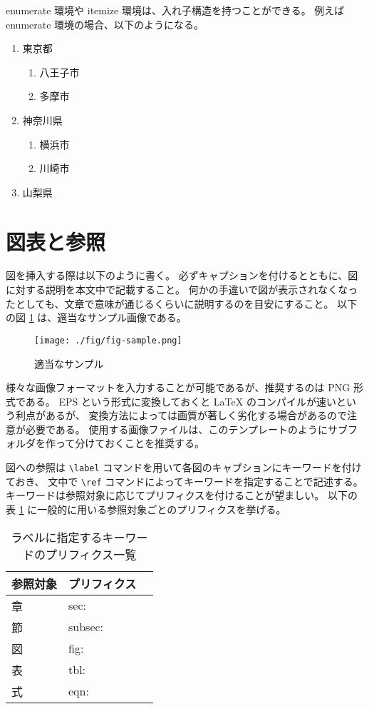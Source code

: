 \documentclass[12pt,a4paper,uplatex,dvipdfmx]{jsarticle}
\begin{document}
enumerate 環境や itemize 環境は、入れ子構造を持つことができる。
例えば enumerate 環境の場合、以下のようになる。
\begin{enumerate}
 \item 東京都
 \begin{enumerate}
  \item 八王子市
  \item 多摩市
 \end{enumerate}
 \item 神奈川県
 \begin{enumerate}
  \item 横浜市
  \item 川崎市
 \end{enumerate}
 \item 山梨県
\end{enumerate}

\section{図表と参照}
\label{sec:fig_tbl}

図を挿入する際は以下のように書く。
必ずキャプションを付けるとともに、図に対する説明を本文中で記載すること。
何かの手違いで図が表示されなくなったとしても、文章で意味が通じるくらいに説明するのを目安にすること。
以下の図 \ref{fig:sample} は、適当なサンプル画像である。

\begin{figure}[H]
  \centering
  \texttt{[image: ./fig/fig-sample.png]}
  \caption{適当なサンプル}
  \label{fig:sample}
\end{figure}

様々な画像フォーマットを入力することが可能であるが、推奨するのは PNG 形式である。
EPS という形式に変換しておくと LaTeX のコンパイルが速いという利点があるが、
変換方法によっては画質が著しく劣化する場合があるので注意が必要である。
使用する画像ファイルは、このテンプレートのようにサブフォルダを作って分けておくことを推奨する。

図への参照は \verb+\label+ コマンドを用いて各図のキャプションにキーワードを付けておき、
文中で \verb+\ref+ コマンドによってキーワードを指定することで記述する。
キーワードは参照対象に応じてプリフィクスを付けることが望ましい。
以下の表 \ref{tbl:pre_list} に一般的に用いる参照対象ごとのプリフィクスを挙げる。

\begin{table}[H]
  \caption{ラベルに指定するキーワードのプリフィクス一覧}
  \label{tbl:pre_list}
  \centering
  \begin{tabular}{|l|l|r|} \hline
   参照対象	& プリフィクス \\ \hline
   章		& sec: \\ \hline
   節		& subsec: \\ \hline
   図		& fig: \\ \hline
   表 		& tbl: \\ \hline
   式   	& eqn: \\ \hline
  \end{tabular}
\end{table}
\end{document}
